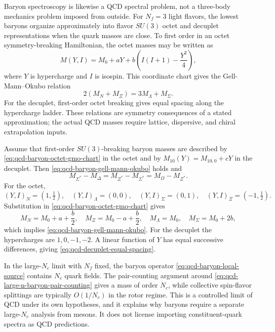 Baryon spectroscopy is likewise a QCD spectral problem, not a three-body
mechanics problem imposed from outside.  For \(N_f=3\) light flavors, the
lowest baryons organize approximately into flavor \(SU(3)\) octet and
decuplet representations when the quark masses are close.  To first order in
an octet symmetry-breaking Hamiltonian, the octet masses may be written as
\begin{equation}
  M(Y,I)=M_0+aY
  +b\left(I(I+1)-\frac{Y^2}{4}\right),
  \label{eq:qcd-baryon-octet-gmo-chart}
\end{equation}
where \(Y\) is hypercharge and \(I\) is isospin.  This coordinate chart gives
the Gell-Mann--Okubo relation
\begin{equation}
  2(M_N+M_\Xi)=3M_\Lambda+M_\Sigma .
  \label{eq:qcd-baryon-gell-mann-okubo}
\end{equation}
For the decuplet, first-order octet breaking gives equal spacing along the
hypercharge ladder.  These relations are symmetry consequences of a stated
approximation; the actual QCD masses require lattice, dispersive, and chiral
extrapolation inputs.

Assume that first-order \(SU(3)\)-breaking baryon masses are described by
\eqref{eq:qcd-baryon-octet-gmo-chart} in the octet and by
\(M_{10}(Y)=M_{10,0}+cY\) in the decuplet.  Then
\eqref{eq:qcd-baryon-gell-mann-okubo} holds and
\begin{equation}
  M_{\Sigma^\ast}-M_\Delta
  =
  M_{\Xi^\ast}-M_{\Sigma^\ast}
  =
  M_\Omega-M_{\Xi^\ast}.
  \label{eq:qcd-decuplet-equal-spacing}
\end{equation}
For the octet,
\[
  (Y,I)_N=(1,\tfrac12),\quad
  (Y,I)_\Lambda=(0,0),\quad
  (Y,I)_\Sigma=(0,1),\quad
  (Y,I)_\Xi=(-1,\tfrac12).
\]
Substitution in \eqref{eq:qcd-baryon-octet-gmo-chart} gives
\[
  M_N=M_0+a+\frac b2,\quad
  M_\Xi=M_0-a+\frac b2,\quad
  M_\Lambda=M_0,\quad
  M_\Sigma=M_0+2b,
\]
which implies \eqref{eq:qcd-baryon-gell-mann-okubo}.  For the decuplet the
hypercharges are \(1,0,-1,-2\).  A linear function of \(Y\) has equal
successive differences, giving \eqref{eq:qcd-decuplet-equal-spacing}.

In the large-\(N_c\) limit with \(N_f\) fixed, the baryon operator
\eqref{eq:qcd-baryon-local-source} contains \(N_c\) quark fields.  The
pair-counting argument around \eqref{eq:qcd-large-n-baryon-pair-counting}
gives a mass of order \(N_c\), while collective spin-flavor splittings are
typically \(O(1/N_c)\) in the rotor regime.  This is a controlled limit of QCD
under its own hypotheses, and it explains why baryons require a separate
large-\(N_c\) analysis from mesons.  It does not license importing
constituent-quark spectra as QCD predictions.

